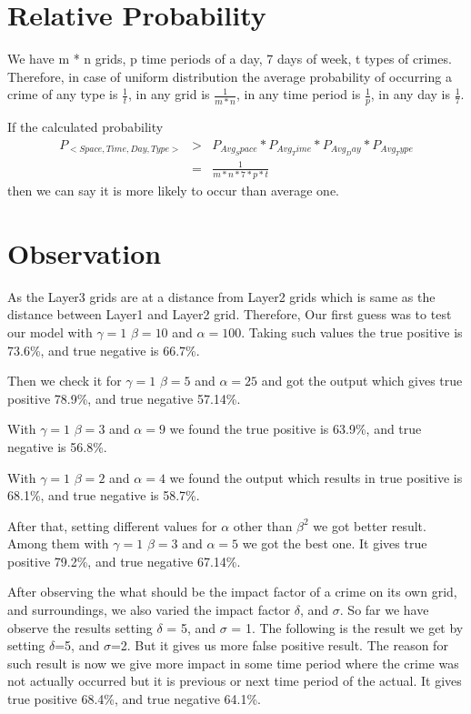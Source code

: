 \documentclass{sig-alternate}
\begin{document}
 \section{Relative Probability}  
 We have m * n grids, p time periods of a day, 7 days of week, t types of crimes. Therefore, in case of uniform distribution the average probability of occurring a crime of any type is  $\frac{1}{t}$, in any grid is  $\frac{1}{m*n}$, in any time period is $ \frac{1}{p}$, in any day is  $\frac{1}{7}$.
 
 If the calculated probability 
 \begin{eqnarray*}
 P_{<Space,Time,Day,Type>}&>&P_{Avg_Space}*P_{Avg_Time}*P_{Avg_Day}*P_{Avg_Type}\\
 &=&\frac{1}{m*n*7*p*t}
 \end{eqnarray*}
 then we can say it is more likely to occur than average one. 
 
      
\section{Observation}
As the Layer3 grids are at a distance from Layer2 grids which is same as the distance between Layer1 and Layer2 grid. Therefore, Our first guess was to test our model with $ \gamma = 1$ $\beta = 10$ and $\alpha = 100$. Taking such values the true positive is 73.6\%, and true negative is 66.7\%.

Then we check it for $ \gamma = 1$ $\beta = 5$ and $\alpha = 25$ and got the output which gives true positive 78.9\%, and true negative 57.14\%.

With $ \gamma = 1$ $\beta = 3$ and $\alpha = 9$ we found the true positive is 63.9\%, and true negative is 56.8\%.



With $ \gamma = 1$ $\beta = 2$ and $\alpha = 4$ we found the output which results in true positive is 68.1\%, and true negative is 58.7\%.

After that, setting different values for $\alpha$ other than $\beta^2$ we got better result. Among them  
with $ \gamma = 1$ $\beta = 3$ and $\alpha = 5$ we got the best one. It gives true positive 79.2\%, and true negative 67.14\%.



After observing the what should be the impact factor of a crime on its own grid, and surroundings, we also varied the impact factor $\delta$, and $\sigma$. So far we have observe the results setting  $\delta$ = 5, and $\sigma$ = 1. The following is the result we get by setting $\delta$=5, and $\sigma$=2. But it gives us more false positive result. The reason for such result is now we give more impact in some time period where the crime was not actually occurred but it is previous or next time period of the actual. It gives true positive 68.4\%, and true negative 64.1\%.
\end{document}
